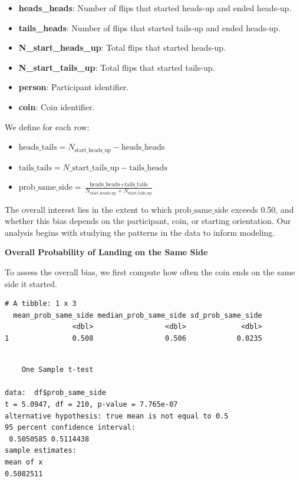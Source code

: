 \documentclass[
  letterpaper,
  DIV=11,
  numbers=noendperiod]{scrartcl}
\providecommand{\tightlist}{%
  \setlength{\itemsep}{0pt}\setlength{\parskip}{0pt}}\usepackage{longtable,booktabs,array}
\begin{document}
\begin{itemize}
\item
  \textbf{heads\_heads}: Number of flips that started heads-up and ended
  heads-up.
\item
  \textbf{tails\_heads}: Number of flips that started tails-up and ended
  heads-up.
\item
  \textbf{N\_start\_heads\_up}: Total flips that started heads-up.
\item
  \textbf{N\_start\_tails\_up}: Total flips that started tails-up.
\item
  \textbf{person}: Participant identifier.
\item
  \textbf{coin}: Coin identifier.
\end{itemize}

We define for each row:

\begin{itemize}
\tightlist
\item
  \(\text{heads_tails} = N_{\text{start_heads_up}} - \text{heads_heads}\)
\item
  \(\text{tails_tails} = N\_{\text{start_tails_up}} - \text{tails_heads}\)
\item
  \(\text{prob_same_side} = \frac{\text{heads_heads} + \text{tails_tails}}{N_{\text{start_heads_up}} + N_{\text{start_tails_up}}}\)
\end{itemize}

The overall interest lies in the extent to which
\(\text{prob_same_side}\) exceeds 0.50, and whether this bias depends on
the participant, coin, or starting orientation. Our analysis begins with
studying the patterns in the data to inform modeling.

\textbf{Overall Probability of Landing on the Same Side}

To assess the overall bias, we first compute how often the coin ends on
the same side it started.

\begin{verbatim}
# A tibble: 1 x 3
  mean_prob_same_side median_prob_same_side sd_prob_same_side
                <dbl>                 <dbl>             <dbl>
1               0.508                 0.506            0.0235
\end{verbatim}

\begin{verbatim}

    One Sample t-test

data:  df$prob_same_side
t = 5.0947, df = 210, p-value = 7.765e-07
alternative hypothesis: true mean is not equal to 0.5
95 percent confidence interval:
 0.5050585 0.5114438
sample estimates:
mean of x 
0.5082511 
\end{verbatim}
\end{document}
